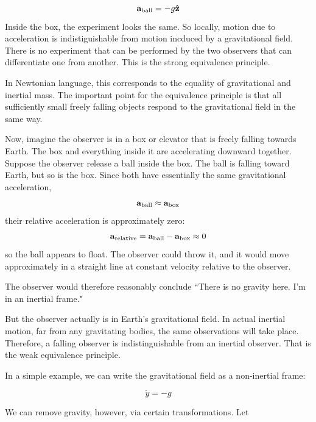 		\begin{equation}
			\vb{a}_\text{ball} = -g\vu{z}
		\end{equation}
		Inside the box, the experiment looks the same. So locally, motion due to acceleration is indistiguishable from motion
		incduced by a gravitational field. There is no experiment that can be performed by the two observers that can differentiate
		one from another. This is the strong equivalence principle.

		In Newtonian language, this corresponds to the equality of gravitational and inertial mass. The important point for the equivalence principle is that all sufficiently small freely falling objects respond to the gravitational field in the same way.

		Now, imagine the observer is in a box or elevator that is freely falling towards Earth.
		The box and everything inside it are accelerating downward together.
		Suppose the observer release a ball inside the box.
		The ball is falling toward Earth, but so is the box. Since both have essentially the same gravitational acceleration,
		\begin{equation}
			\vb{a}_\text{ball}\approx \vb{a}_\text{box}
		\end{equation}
		their relative acceleration is approximately zero:
		\begin{equation}
			\vb{a}_\text{relative} = \vb{a}_\text{ball} - \vb{a}_\text{box} \approx 0
		\end{equation}
		so the ball appears to float. The observer could throw it, and it would move approximately in a straight line at constant velocity relative to the observer.

		The observer would therefore reasonably conclude ``There is no gravity here. I'm in an inertial frame."

		But the observer actually is in Earth's gravitational field. In actual inertial motion, far from any gravitating bodies, the same observations will take place.
		Therefore, a falling observer is indistinguishable from an inertial observer. That is the weak equivalence principle.


		In a simple example, we can write the gravitational field as a non-inertial frame:

		\begin{equation}
			\ddot{y} = - g
		\end{equation}

		We can remove gravity, however, via certain transformations. Let

